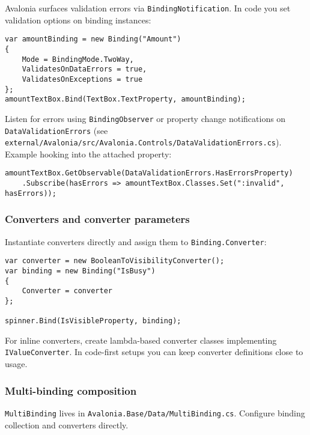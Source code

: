 Avalonia surfaces validation errors via
\passthrough{\lstinline!BindingNotification!}. In code you set
validation options on binding instances:

\begin{lstlisting}
var amountBinding = new Binding("Amount")
{
    Mode = BindingMode.TwoWay,
    ValidatesOnDataErrors = true,
    ValidatesOnExceptions = true
};
amountTextBox.Bind(TextBox.TextProperty, amountBinding);
\end{lstlisting}

Listen for errors using \passthrough{\lstinline!BindingObserver!} or
property change notifications on
\passthrough{\lstinline!DataValidationErrors!} (see
\passthrough{\lstinline!external/Avalonia/src/Avalonia.Controls/DataValidationErrors.cs!}).
Example hooking into the attached property:

\begin{lstlisting}
amountTextBox.GetObservable(DataValidationErrors.HasErrorsProperty)
    .Subscribe(hasErrors => amountTextBox.Classes.Set(":invalid", hasErrors));
\end{lstlisting}

\subsubsection{Converters and converter
parameters}\label{converters-and-converter-parameters}

Instantiate converters directly and assign them to
\passthrough{\lstinline!Binding.Converter!}:

\begin{lstlisting}
var converter = new BooleanToVisibilityConverter();
var binding = new Binding("IsBusy")
{
    Converter = converter
};

spinner.Bind(IsVisibleProperty, binding);
\end{lstlisting}

For inline converters, create lambda-based converter classes
implementing \passthrough{\lstinline!IValueConverter!}. In code-first
setups you can keep converter definitions close to usage.

\subsubsection{Multi-binding
composition}\label{multi-binding-composition}

\passthrough{\lstinline!MultiBinding!} lives in
\passthrough{\lstinline!Avalonia.Base/Data/MultiBinding.cs!}. Configure
binding collection and converters directly.

